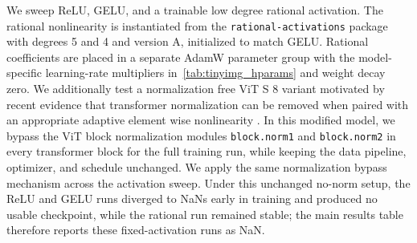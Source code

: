 \documentclass{article}
\theoremstyle{plain}
\theoremstyle{definition}
\theoremstyle{remark}
\begin{document}
We sweep ReLU, GELU, and a trainable low degree rational activation. The rational nonlinearity is instantiated from the \texttt{rational-activations} package \cite{delfosse2020rationals} with degrees 5 and 4 and version A, initialized to match GELU.  {Rational coefficients are placed in a separate AdamW parameter group with the model-specific learning-rate multipliers in~\cref{tab:tinyimg_hparams} and weight decay zero. We additionally test a normalization free ViT S 8 variant motivated by recent evidence that transformer normalization can be removed when paired with an appropriate adaptive element wise nonlinearity \cite{zhu2025transformerswithoutnorm}. In this modified model, we bypass the ViT block normalization modules \texttt{block.norm1} and \texttt{block.norm2} in every transformer block for the full training run, while keeping the data pipeline, optimizer, and schedule unchanged. We apply the same normalization bypass mechanism across the activation sweep. Under this unchanged no-norm setup, the ReLU and GELU runs diverged to NaNs early in training and produced no usable checkpoint, while the rational run remained stable; the main results table therefore reports these fixed-activation runs as NaN.}

\FloatBarrier
\end{document}
